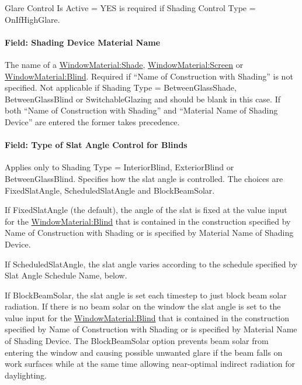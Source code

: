 Glare Control Is Active = YES is required if Shading Control Type = OnIfHighGlare.

\paragraph{Field: Shading Device Material Name}\label{field-shading-device-material-name}

The name of a \hyperref[windowmaterialshade]{WindowMaterial:Shade}, \hyperref[windowmaterialscreen]{WindowMaterial:Screen} or \hyperref[windowmaterialblind]{WindowMaterial:Blind}. Required if ``Name of Construction with Shading'' is not specified. Not applicable if Shading Type = BetweenGlassShade, BetweenGlassBlind or SwitchableGlazing and should be blank in this case. If both ``Name of Construction with Shading'' and ``Material Name of Shading Device'' are entered the former takes precedence.

\paragraph{Field: Type of Slat Angle Control for Blinds}\label{field-type-of-slat-angle-control-for-blinds}

Applies only to Shading Type = InteriorBlind, ExteriorBlind or BetweenGlassBlind. Specifies how the slat angle is controlled. The choices are FixedSlatAngle, ScheduledSlatAngle and BlockBeamSolar.

If FixedSlatAngle (the default), the angle of the slat is fixed at the value input for the \hyperref[windowmaterialblind]{WindowMaterial:Blind} that is contained in the construction specified by Name of Construction with Shading or is specified by Material Name of Shading Device.

If ScheduledSlatAngle, the slat angle varies according to the schedule specified by Slat Angle Schedule Name, below.

If BlockBeamSolar, the slat angle is set each timestep to just block beam solar radiation. If there is no beam solar on the window the slat angle is set to the value input for the \hyperref[windowmaterialblind]{WindowMaterial:Blind} that is contained in the construction specified by Name of Construction with Shading or is specified by Material Name of Shading Device. The BlockBeamSolar option prevents beam solar from entering the window and causing possible unwanted glare if the beam falls on work surfaces while at the same time allowing near-optimal indirect radiation for daylighting.

